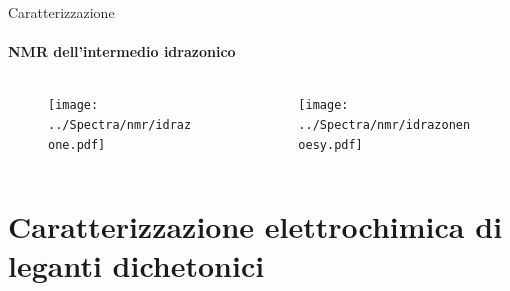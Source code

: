 \documentclass[aspectration=169]{beamer}
\begin{document}
\begin{frame}{Caratterizzazione}
	\centering
	\framesubtitle{NMR dell'intermedio idrazonico}
	\vspace{-1cm}
	\begin{columns}
		\begin{column}{0.55\textwidth}
			\begin{figure}[h!]
				\texttt{[image: ../Spectra/nmr/idrazone.pdf]}
			\end{figure}
		\end{column}
		\begin{column}{0.55\textwidth}
			\begin{figure}[h!]
				\texttt{[image: ../Spectra/nmr/idrazonenoesy.pdf]}
			\end{figure}

			\hspace{2cm}
		\end{column}
	\end{columns}
\end{frame}

\section{Caratterizzazione elettrochimica di leganti dichetonici}
\end{document}
